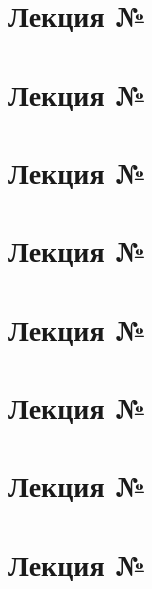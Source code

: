 
% 




\section{Лекция № \thesection}


\section{Лекция № \thesection}


\section{Лекция № \thesection}


\section{Лекция № \thesection}


\section{Лекция № \thesection}


\setcounter{section}{7}
\section{Лекция № \thesection}


\setcounter{section}{9}
\section{Лекция № \thesection } %


\setcounter{section}{10}
\section{Лекция № \thesection}
